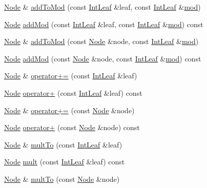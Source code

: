 \begin{DoxyCompactItemize}
\item 
\hyperlink{class_node}{Node} \& \hyperlink{class_node_ab11fa7ff8a60506e6bb40d63e8915cc4}{add\-To\-Mod} (const \hyperlink{class_int_leaf}{Int\-Leaf} \&leaf, const \hyperlink{class_int_leaf}{Int\-Leaf} \&\hyperlink{class_node_a7744980c6da2415c02b583c5b149d50d}{mod})
\item 
\hyperlink{class_node}{Node} \hyperlink{class_node_acfacf729f89f5323b6e1b84068f9af9e}{add\-Mod} (const \hyperlink{class_int_leaf}{Int\-Leaf} \&leaf, const \hyperlink{class_int_leaf}{Int\-Leaf} \&\hyperlink{class_node_a7744980c6da2415c02b583c5b149d50d}{mod}) const 
\item 
\hyperlink{class_node}{Node} \& \hyperlink{class_node_aeb43d1eb8c37653b358a6b10146830d5}{add\-To\-Mod} (const \hyperlink{class_node}{Node} \&node, const \hyperlink{class_int_leaf}{Int\-Leaf} \&\hyperlink{class_node_a7744980c6da2415c02b583c5b149d50d}{mod})
\item 
\hyperlink{class_node}{Node} \hyperlink{class_node_a7e486eaa03af545ab88e073ff66ade72}{add\-Mod} (const \hyperlink{class_node}{Node} \&node, const \hyperlink{class_int_leaf}{Int\-Leaf} \&\hyperlink{class_node_a7744980c6da2415c02b583c5b149d50d}{mod}) const 
\item 
\hyperlink{class_node}{Node} \& \hyperlink{class_node_a93ad5163448f65efe9ff4f816620ce15}{operator+=} (const \hyperlink{class_int_leaf}{Int\-Leaf} \&leaf)
\item 
\hyperlink{class_node}{Node} \hyperlink{class_node_a760ed8d9512bcdbd1d2c50a1e9db0c88}{operator+} (const \hyperlink{class_int_leaf}{Int\-Leaf} \&leaf) const 
\item 
\hyperlink{class_node}{Node} \& \hyperlink{class_node_aefaf03590fe3f94039db698524a263fe}{operator+=} (const \hyperlink{class_node}{Node} \&node)
\item 
\hyperlink{class_node}{Node} \hyperlink{class_node_ab340f7a5d7aef6d514c83378c1af3bb9}{operator+} (const \hyperlink{class_node}{Node} \&node) const 
\item 
\hyperlink{class_node}{Node} \& \hyperlink{class_node_a80101b65aa4de587b00ebe31c377e0d8}{mult\-To} (const \hyperlink{class_int_leaf}{Int\-Leaf} \&leaf)
\item 
\hyperlink{class_node}{Node} \hyperlink{class_node_aa975fa8176089de17add587ab9dc2f67}{mult} (const \hyperlink{class_int_leaf}{Int\-Leaf} \&leaf) const 
\item 
\hyperlink{class_node}{Node} \& \hyperlink{class_node_ae3250c7847ec855bd8b30105e60349c4}{mult\-To} (const \hyperlink{class_node}{Node} \&node)

\end{DoxyCompactItemize}
